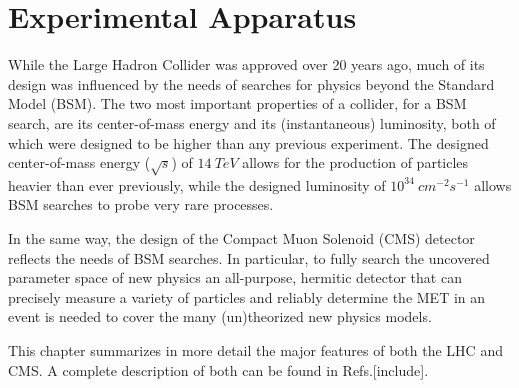 \chapter{Experimental Apparatus}

While the Large Hadron Collider was approved over 20 years ago, much of its design was influenced by the needs of searches for physics beyond the Standard Model (BSM).
The two most important properties of a collider, for a BSM search, are its center-of-mass energy and its (instantaneous) luminosity, both of which were designed to be higher than any previous experiment. 
The designed center-of-mass energy ($\sqrt{s}$) of $14~TeV$ allows for the production of particles heavier than ever previously, while the designed luminosity of $10^{34}~cm^{-2}s^{-1}$ allows BSM searches to probe very rare processes.

In the same way, the design of the Compact Muon Solenoid (CMS) detector reflects the needs of BSM searches.
In particular, to fully search the uncovered parameter space of new physics an all-purpose, hermitic detector that can precisely measure a variety of particles and reliably determine the MET in an event is needed to cover the many (un)theorized new physics models.

This chapter summarizes in more detail the major features of both the LHC and CMS.
A complete description of both can be found in Refs.[include].

